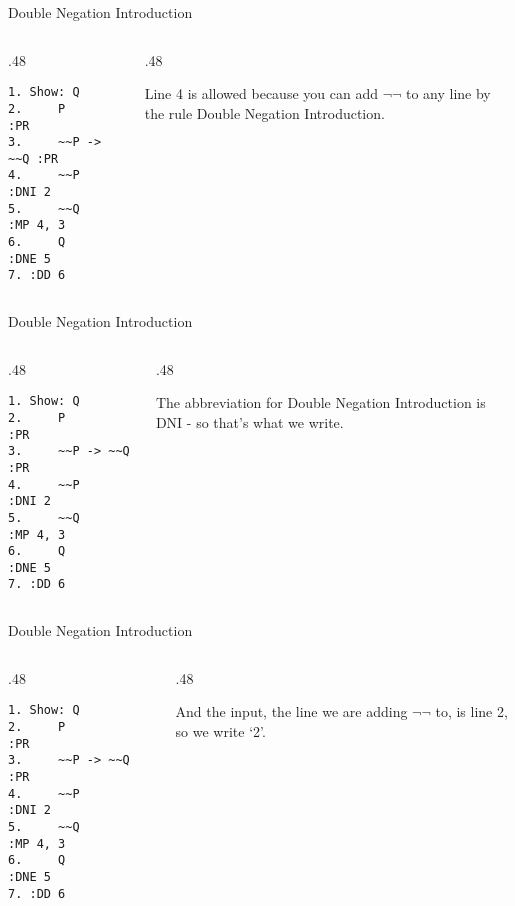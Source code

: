 \documentclass[
  ignorenonframetext,
]{beamer}
\renewcommand{\,}{\text{, }}
\def\begincols{\begin{columns}}
\def\begincol{\begin{column}}
\def\endcol{\end{column}}
\def\endcols{\end{columns}}
\begin{document}
\begin{frame}[fragile]{Double Negation Introduction}
\protect\hypertarget{double-negation-introduction-3}{}

\begincols
\begincol{.48\textwidth}

\begin{verbatim}
1. Show: Q
2.     P          :PR
3.     ~~P -> ~~Q :PR
4.     ~~P        :DNI 2
5.     ~~Q        :MP 4, 3
6.     Q          :DNE 5
7. :DD 6
\end{verbatim}

\endcol
\begincol{.48\textwidth}

Line 4 is allowed because you can add \(\neg \neg\) to any line by the
rule Double Negation Introduction.

\endcol
\endcols

\end{frame}

\begin{frame}[fragile]{Double Negation Introduction}
\protect\hypertarget{double-negation-introduction-4}{}

\begincols
\begincol{.48\textwidth}

\begin{verbatim}
1. Show: Q
2.     P          :PR
3.     ~~P -> ~~Q :PR
4.     ~~P        :DNI 2
5.     ~~Q        :MP 4, 3
6.     Q          :DNE 5
7. :DD 6
\end{verbatim}

\endcol
\begincol{.48\textwidth}

The abbreviation for Double Negation Introduction is DNI - so that's
what we write.

\endcol
\endcols

\end{frame}

\begin{frame}[fragile]{Double Negation Introduction}
\protect\hypertarget{double-negation-introduction-5}{}

\begincols
\begincol{.48\textwidth}

\begin{verbatim}
1. Show: Q
2.     P          :PR
3.     ~~P -> ~~Q :PR
4.     ~~P        :DNI 2
5.     ~~Q        :MP 4, 3
6.     Q          :DNE 5
7. :DD 6
\end{verbatim}

\endcol
\begincol{.48\textwidth}

And the input, the line we are adding \(\neg \neg\) to, is line 2, so we
write `2'.

\endcol
\endcols

\end{frame}
\end{document}
